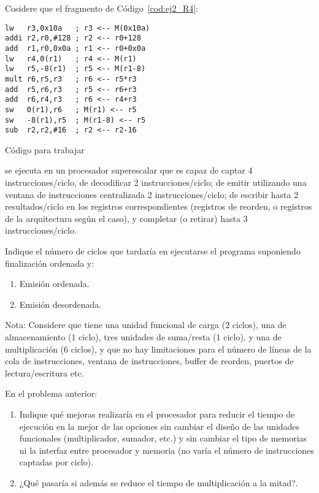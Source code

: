 \begin{ejercicio}
    Cosidere que el fragmento de Código~\ref{cod:ej2_R4}:
    \begin{listing}[H]
    \begin{verbatim}
lw   r3,0x10a   ; r3 <-- M(0x10a)
addi r2,r0,#128 ; r2 <-- r0+128
add  r1,r0,0x0a ; r1 <-- r0+0x0a
lw   r4,0(r1)   ; r4 <-- M(r1)
lw   r5,-8(r1)  ; r5 <-- M(r1-8)
mult r6,r5,r3   ; r6 <-- r5*r3
add  r5,r6,r3   ; r5 <-- r6+r3
add  r6,r4,r3   ; r6 <-- r4+r3
sw   0(r1),r6   ; M(r1) <-- r5
sw   -8(r1),r5  ; M(r1-8) <-- r5
sub  r2,r2,#16  ; r2 <-- r2-16
    \end{verbatim}
    \caption{Código para trabajar}
    \label{cod:ej2_R4}
    \end{listing}
se ejecuta en un procesador superescalar que es capaz de captar 4 instrucciones/ciclo, de decodificar 2 instrucciones/ciclo; de emitir utilizando una ventana de instrucciones centralizada 2 instrucciones/ciclo; de escribir hasta 2 resultados/ciclo en los registros correspondientes (registros de reorden, o registros de la arquitectura según el caso), y completar (o retirar) hasta 3 instrucciones/ciclo.

Indique el número de ciclos que tardaría en ejecutarse el programa suponiendo finalización ordenada y:
\begin{enumerate}
    \item Emisión ordenada.
    \item Emisión desordenada.
\end{enumerate}
Nota: Considere que tiene una unidad funcional de carga (2 ciclos), una de almacenamiento (1 ciclo), tres unidades de suma/resta (1 ciclo), y una de multiplicación (6 ciclos), y que no hay limitaciones para el número de líneas de la cola de instrucciones, ventana de instrucciones, buffer de reorden, puertos de lectura/escritura etc.
\end{ejercicio}

\begin{ejercicio}\label{ej:3_R4}
   En el problema anterior: 
   \begin{enumerate}
       \item Indique qué mejoras realizaría en el procesador para reducir el tiempo de ejecución en la mejor de las opciones sin cambiar el diseño de las unidades funcionales (multiplicador, sumador, etc.) y sin cambiar el tipo de memorias ni la interfaz entre procesador y memoria (no varía el número de instrucciones captadas por ciclo).
       \item ¿Qué pasaría si además se reduce el tiempo de multiplicación a la mitad?. 
   \end{enumerate}
\end{ejercicio}

